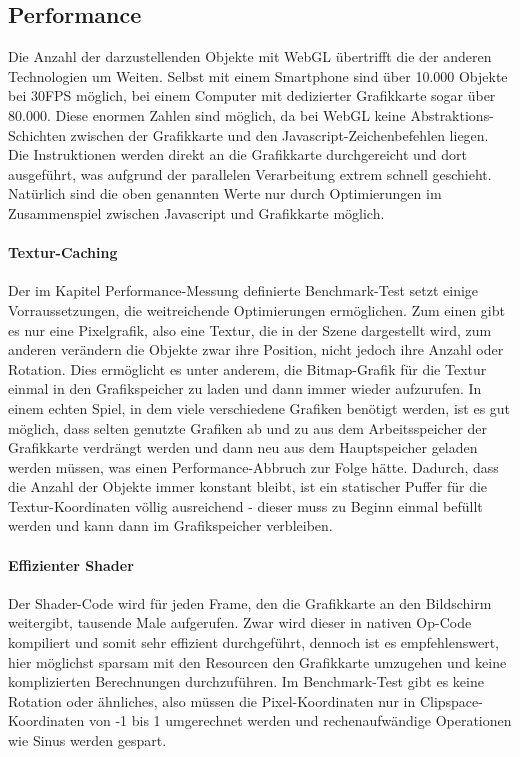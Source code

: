 \documentclass[a4paper, 12pt]{article}
\begin{document}
\subsection{Performance}
Die Anzahl der darzustellenden Objekte mit WebGL übertrifft die der anderen Technologien um Weiten. Selbst mit einem Smartphone sind über 10.000 Objekte bei 30FPS möglich, bei einem Computer mit dedizierter Grafikkarte sogar über 80.000. Diese enormen Zahlen sind möglich, da bei WebGL keine Abstraktions-Schichten zwischen der Grafikkarte und den Javascript-Zeichenbefehlen liegen. Die Instruktionen werden direkt an die Grafikkarte durchgereicht und dort ausgeführt, was aufgrund der parallelen Verarbeitung extrem schnell geschieht. Natürlich sind die oben genannten Werte nur durch Optimierungen im Zusammenspiel zwischen Javascript und Grafikkarte möglich.
\paragraph{Textur-Caching} Der im Kapitel Performance-Messung definierte Benchmark-Test setzt einige Vorraussetzungen, die weitreichende Optimierungen ermöglichen. Zum einen gibt es nur eine Pixelgrafik, also eine Textur, die in der Szene dargestellt wird, zum anderen verändern die Objekte zwar ihre Position, nicht jedoch ihre Anzahl oder Rotation. Dies ermöglicht es unter anderem, die Bitmap-Grafik für die Textur einmal in den Grafikspeicher zu laden und dann immer wieder aufzurufen. In einem echten Spiel, in dem viele verschiedene Grafiken benötigt werden, ist es gut möglich, dass selten genutzte Grafiken ab und zu aus dem Arbeitsspeicher der Grafikkarte verdrängt werden und dann neu aus dem Hauptspeicher geladen werden müssen, was einen Performance-Abbruch zur Folge hätte.
Dadurch, dass die Anzahl der Objekte immer konstant bleibt, ist ein statischer Puffer für die Textur-Koordinaten völlig ausreichend - dieser muss zu Beginn einmal befüllt werden und kann dann im Grafikspeicher verbleiben.
\paragraph{Effizienter Shader} Der Shader-Code wird für jeden Frame, den die Grafikkarte an den Bildschirm weitergibt, tausende Male aufgerufen. Zwar wird dieser in nativen Op-Code kompiliert und somit sehr effizient durchgeführt, dennoch ist es empfehlenswert, hier möglichst sparsam mit den Resourcen den Grafikkarte umzugehen und keine komplizierten Berechnungen durchzuführen. Im Benchmark-Test gibt es keine Rotation oder ähnliches, also müssen die Pixel-Koordinaten nur in Clipspace-Koordinaten von -1 bis 1 umgerechnet werden und rechenaufwändige Operationen wie Sinus werden gespart.
\end{document}
